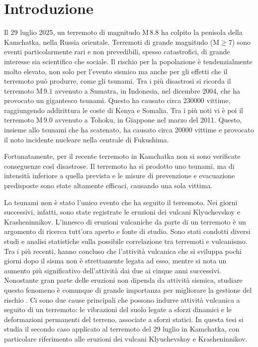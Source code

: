 \chapter*{Introduzione}

Il 29 luglio 2025, un terremoto di magnitudo \(\mathrm{M}\,8.8\) ha colpito la penisola della Kamchatka, nella Russia orientale.
Terremoti di grande magnitudo (\(\mathrm{M}\ge7\)) sono eventi particolarmente rari e non prevedibili, spesso catastrofici, di grande interesse sia scientifico che sociale. Il rischio per la popolazione è tendenzialmente molto elevato, non solo per l'evento sismico ma anche per gli effetti che il terremoto può produrre, come gli tsunami. Tra i più disastrosi si ricorda il terremoto \(\mathrm{M}\,9.1\) avvenuto a Sumatra, in Indonesia, nel dicembre 2004, che ha provocato un gigantesco tsunami. Questo ha causato circa \qty{230000}{} vittime, raggiungendo addirittura le coste di Kenya e Somalia. Tra i più noti vi è poi il terremoto \(\mathrm{M}\,9.0\) avvenuto a Tohoku, in Giappone nel marzo del 2011. Questo, insieme allo tsunami che ha scatenato, ha causato circa \qty{20000}{} vittime e provocato il noto incidente nucleare nella centrale di Fukushima.

Fortunatamente, per il recente terremoto in Kamchatka non si sono verificate conseguenze così disastrose. Il terremoto ha sì prodotto uno tsunami, ma di intensità inferiore a quella prevista e le misure di prevenzione e evacuazione predisposte sono state altamente efficaci, causando una sola vittima.

Lo tsunami non è stato l'unico evento che ha seguito il terremoto. Nei giorni successivi, infatti, sono state registrate le eruzioni dei vulcani Klyuchevskoy e Krasheninnikov. L'innesco di eruzioni vulcaniche da parte di un terremoto è un argomento di ricerca tutt'ora aperto e fonte di studio.
Sono stati condotti diversi studi e analisi statistiche sulla possibile correlazione tra terremoti e vulcanismo. Tra i più recenti, \citet{Sawi2018ShortTermEQVolcanism} hanno concluso che l'attività vulcanica che si sviluppa pochi giorni dopo il sisma non è strettamente legata ad esso, mentre si nota un aumento più significativo dell'attività dai due ai cinque anni successivi. 
Nonostante gran parte delle eruzioni non dipenda da attività sismica, studiare questo fenomeno è comunque di grande importanza per migliorare la gestione del rischio \citep{Seropian2021EarthquakesVolcanoes}.
Ci sono due cause principali che possono indurre attività vulcanica a seguito di un terremoto: le vibrazioni del suolo legate a sforzi dinamici e le deformazioni permanenti del terreno, associate a sforzi statici.
In questa tesi si studia il secondo caso applicato al terremoto del 29 luglio in Kamchatka, con particolare riferimento alle eruzioni dei vulcani Klyuchevskoy e Krasheninnikov.

